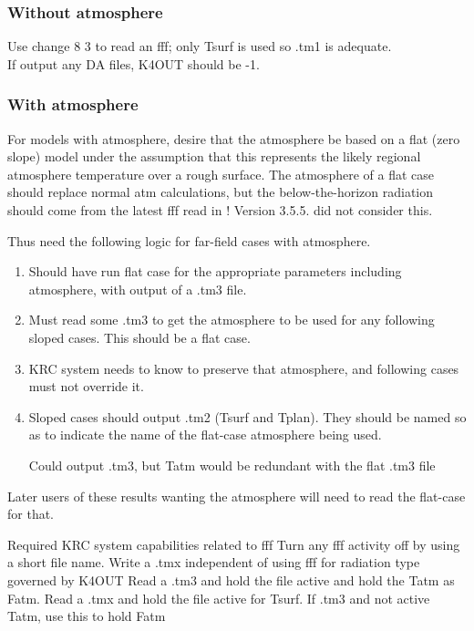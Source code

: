 \subsubsection{Without atmosphere}

Use change 8 3 to read an fff; only Tsurf is used so .tm1 is adequate.
\\ If output any DA files, K4OUT should be -1. 

\subsubsection{With atmosphere}

For models with atmosphere, desire that the atmosphere be based on a flat (zero
slope) model under the assumption that this represents the likely regional
atmosphere temperature over a rough surface. The atmosphere of a flat case
should replace normal atm calculations, but the below-the-horizon radiation
should come from the latest fff read in !  Version 3.5.5. did not consider this.

Thus need the following logic for far-field cases with atmosphere.

\begin{enumerate}    %
 \item Should have run flat case for the appropriate parameters including
 atmosphere, with output of a .tm3 file.

 \item Must read some .tm3 to get the atmosphere to be used for any
 following sloped cases. This should be a flat case.

\item  KRC system needs to know to preserve that atmosphere, and following cases must not override it. 

 \item Sloped cases should output .tm2 (Tsurf and Tplan). They should be named
 so as to indicate the name of the flat-case atmosphere being used.

Could output .tm3, but Tatm would be redundant with the flat .tm3 file

\end{enumerate}

Later users of these results wanting the atmosphere will need to read the
flat-case for that.

Required KRC system capabilities related to fff
\qi Turn any fff activity off by using a short file name.
\qi Write a .tmx independent of using fff for radiation
\qii type governed by K4OUT
\qi Read a .tm3 and hold the file active and hold the Tatm as Fatm.
\qi Read a .tmx and hold the file active for Tsurf. 
\qii If .tm3 and not active Tatm, use this to hold Fatm


